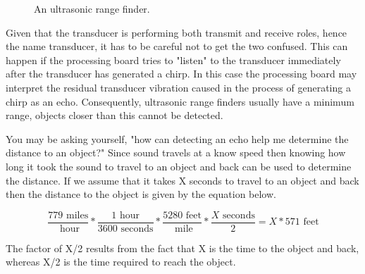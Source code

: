                             \begin{figure}[ht]
                                \caption{An ultrasonic range finder.}
                                \label{fig:commonPeripheralComponentsultra}
                            \end{figure}

                            Given that the transducer is performing both transmit and receive
                            roles, hence the name transducer, it has to be careful not to get
                            the two confused.  This can
                            happen if the processing board tries to "listen" to the transducer
                            immediately after the transducer has generated a chirp.  In this case
                            the processing board may interpret the residual transducer vibration
                            caused in the process of generating a chirp as an echo.  Consequently,
                            ultrasonic range finders
                            usually have a minimum range, objects closer than this cannot be detected.

                            You may be asking yourself, "how can detecting an echo help me determine
                            the distance to an object?"  Since sound travels at a know speed
                            then knowing how long it took the sound to travel
                            to an object and back can be used to determine the distance.  If we assume
                            that it takes X seconds to travel to an object and back then the distance
                            to the object is given by the equation below.

                            $$    \frac{779 \text{ \ miles}}{\text{ \ hour}} *
                            \frac{1 \text{ \ hour}} {3600 \text{ \ seconds}} *
                            \frac{5280 \text{ \ feet}}{\text{ \ mile}} *
                            \frac{X \text{ \ seconds}}{2} =
                            X * 571 \text{ \ feet} $$

                            The factor of X/2 results from the fact that X is the time to the
                            object and back, whereas X/2 is the time required to reach the object.


